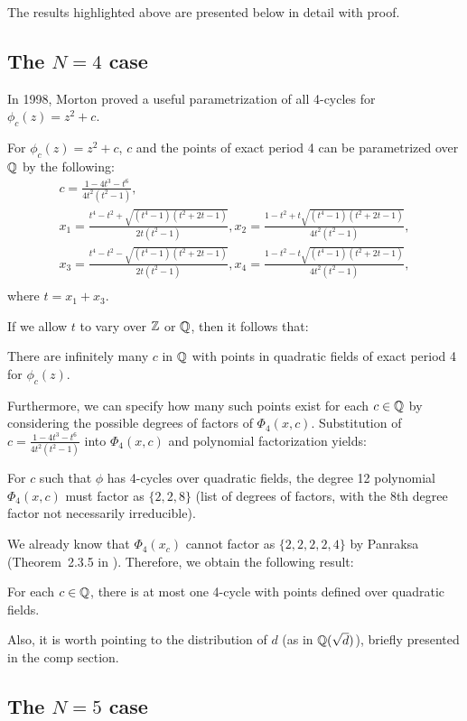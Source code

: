 The results highlighted above are presented below in detail with
proof.

\subsection{The $N = 4$ case}

In 1998, Morton proved a useful parametrization of all 4-cycles for
$\phi_c(z) = z^2 + c$.

\begin{theorem} 
	For $\phi_c(z) = z^2 + c$, $c$ and the points of exact period 4
	can be parametrized over $\mathbb{Q}$ by the following:
	\[
	\begin{gathered}
		c = \frac{1 - 4t^3 - t^6}{4t^2(t^2 - 1)}, \\
		x_1 = \frac{t^4 - t^2 + \sqrt{(t^4 - 1)(t^2 + 2t - 1)}}{2t(t^2 - 1)},
		x_2	= \frac{1 - t^2 + t \sqrt{(t^4 - 1)(t^2 + 2t - 1)}}{4t^2(t^2 - 1)}, \\
		x_3 = \frac{t^4 - t^2 - \sqrt{(t^4 - 1)(t^2 + 2t - 1)}}{2t(t^2 - 1)},
		x_4 = \frac{1 - t^2 - t \sqrt{(t^4 - 1)(t^2 + 2t - 1)}}{4t^2(t^2 - 1)}, \\
	\end{gathered}
	\]
	where $t = x_1 + x_3$.
\end{theorem}

If we allow $t$ to vary over $\mathbb{Z}$ or $\mathbb{Q}$, then it follows that:

\begin{corollary}
	There are infinitely many $c$ in $\mathbb{Q}$ with points in quadratic
	fields of exact period 4 for $\phi_c(z)$.
\end{corollary}

Furthermore, we can specify how many such points exist for each $c
\in \mathbb{Q}$ by considering the possible degrees of factors of $\Phi_4(
x,c)$. Substitution of $c = \frac{1 - 4t^3 - t^6}{4t^2(t^2 - 1)}$
into $\Phi_4(x,c)$ and polynomial factorization yields:

\begin{lemma}
	For $c$ such that $\phi$ has 4-cycles over quadratic fields,
	the degree 12 polynomial $\Phi_4(x,c)$ must factor as $\{2,2,8\}$
	(list of degrees of factors, with the 8th degree factor not
	necessarily irreducible).
\end{lemma}

We already know that $\Phi_4(x_c)$ cannot factor as $\{2,2,2,2,4\}$
by Panraksa (Theorem~2.3.5 in \cite{MR2982105}). Therefore, we
obtain the following result:

\begin{theorem}
  For each $c \in \mathbb{Q}$, there is at most one 4-cycle with points
	defined over quadratic fields.
\end{theorem}

Also, it is worth pointing to the distribution of $d$ (as in
$\mathbb{Q}(\sqrt{d})$), briefly presented in the comp section.

\subsection{The $N = 5$ case}



